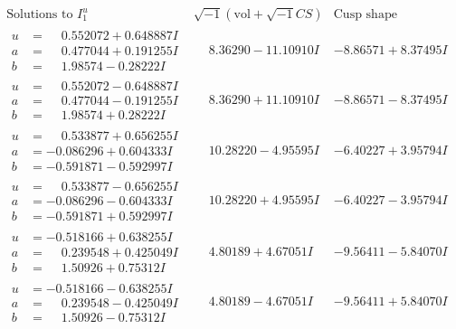 \documentclass[1p]{elsarticle_modified}
\theoremstyle{definition}
\newcommand{\I}{\sqrt{-1}}
\begin{document}
$$\begin{array}{c|c|c}  
\text{Solutions to }I^u_{1}& \I (\text{vol} + \sqrt{-1}CS) & \text{Cusp shape}\\
 \hline 
\begin{aligned}
u &= \phantom{-}0.552072 + 0.648887 I \\
a &= \phantom{-}0.477044 + 0.191255 I \\
b &= \phantom{-}1.98574 - 0.28222 I\end{aligned}
 & \phantom{-}8.36290 - 11.10910 I & -8.86571 + 8.37495 I \\ \hline\begin{aligned}
u &= \phantom{-}0.552072 - 0.648887 I \\
a &= \phantom{-}0.477044 - 0.191255 I \\
b &= \phantom{-}1.98574 + 0.28222 I\end{aligned}
 & \phantom{-}8.36290 + 11.10910 I & -8.86571 - 8.37495 I \\ \hline\begin{aligned}
u &= \phantom{-}0.533877 + 0.656255 I \\
a &= -0.086296 + 0.604333 I \\
b &= -0.591871 - 0.592997 I\end{aligned}
 & \phantom{-}10.28220 - 4.95595 I & -6.40227 + 3.95794 I \\ \hline\begin{aligned}
u &= \phantom{-}0.533877 - 0.656255 I \\
a &= -0.086296 - 0.604333 I \\
b &= -0.591871 + 0.592997 I\end{aligned}
 & \phantom{-}10.28220 + 4.95595 I & -6.40227 - 3.95794 I \\ \hline\begin{aligned}
u &= -0.518166 + 0.638255 I \\
a &= \phantom{-}0.239548 + 0.425049 I \\
b &= \phantom{-}1.50926 + 0.75312 I\end{aligned}
 & \phantom{-}4.80189 + 4.67051 I & -9.56411 - 5.84070 I \\ \hline\begin{aligned}
u &= -0.518166 - 0.638255 I \\
a &= \phantom{-}0.239548 - 0.425049 I \\
b &= \phantom{-}1.50926 - 0.75312 I\end{aligned}
 & \phantom{-}4.80189 - 4.67051 I & -9.56411 + 5.84070 I \\ \hline\begin{aligned}

\end{aligned}
\end{array}$$
\end{document}
